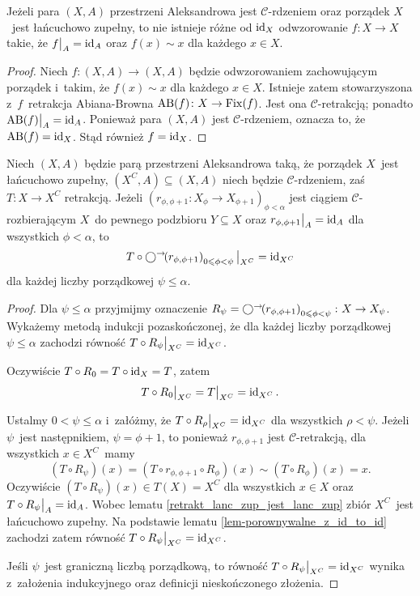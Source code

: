 \begin{lem}\label{lem-porownywalne_z_id_to_id}
Jeżeli para $(X,A)$ przestrzeni Aleksandrowa jest \mbox{$\mathcal{C}$-rdzeniem} oraz porządek $X$~jest łańcuchowo zupełny, to nie istnieje różne od $\operatorname{id}_X$ odwzorowanie $f\colon X\to X$ takie, że $f\big|_A=\operatorname{id}_A$ oraz $f(x)\sim x$ dla każdego $x\in X$.
\end{lem}
\begin{proof}
Niech $f\colon (X,A)\to (X,A)$ będzie odwzorowaniem zachowującym porządek i~takim, że $f(x)\sim x$ dla każdego $x\in X$. Istnieje zatem stowarzyszona z~$f$~retrakcja Abiana-Browna $\operatorname{AB}(f)\colon X\to \operatorname{Fix}(f)$. Jest ona $\mathcal{C}$-retrakcją; ponadto $\operatorname{AB}(f)\big|_A=\operatorname{id}_A$. Ponieważ para $(X,A)$ jest $\mathcal{C}$-rdzeniem, oznacza to, że $\operatorname{AB}(f)=\operatorname{id}_X$. Stąd również $f=\operatorname{id}_X$.
\end{proof}

\begin{lem}\label{lem-schroder_lemma}
Niech $(X,A)$ będzie parą przestrzeni Aleksandrowa taką, że porządek $X$~jest łańcuchowo zupełny, $(X^C,A)\subseteq (X,A)$ niech będzie $\mathcal{C}$-rdzeniem, zaś $T\colon X\to X^C$ retrakcją. Jeżeli $\left(r_{\phi,\phi+1}\colon X_\phi\to X_{\phi+1}\right)_{\phi<\alpha}$ jest ciągiem $\mathcal{C}$-rozbierającym $X$~do pewnego podzbioru $Y\subseteq X$ oraz $r_{\phi,\phi+1}\big|_A=\operatorname{id}_A$ dla wszystkich $\phi<\alpha$, to \[T\circ \bigcirc^\rightarrow\!\!\left(r_{\phi,\phi+1}\right)_{0\leqslant \phi<\psi}\big|_{X^C}=\operatorname{id}_{X^C}\] dla każdej liczby porządkowej $\psi\leq \alpha$. 
\end{lem}
\begin{proof}
Dla $\psi\leq \alpha$ przyjmijmy oznaczenie $R_\psi=\bigcirc^\rightarrow\!\!\left(r_{\phi,\phi+1}\right)_{0\leqslant \phi<\psi}\colon X\to X_{\psi}$. Wykażemy metodą indukcji pozaskończonej, że dla każdej liczby porządkowej $\psi\leq \alpha$ zachodzi równość $T\circ R_\psi\big|_{X^C}=\operatorname{id}_{X^C}$.

Oczywiście $T\circ R_0=T\circ \operatorname{id}_X=T$, zatem \[T\circ R_0\big|_{X^C}=T\big|_{X^C}=\operatorname{id}_{X^C}.\]

Ustalmy $0<\psi\leq \alpha$ i~załóżmy, że $T\circ R_\rho\big|_{X^C}=\operatorname{id}_{X^C}$ dla wszystkich $\rho<\psi$. Jeżeli $\psi$~jest następnikiem, $\psi=\phi+1$, to ponieważ $r_{\phi,\phi+1}$ jest $\mathcal{C}$-retrakcją, dla wszystkich $x\in X^C$~mamy \[\left(T\circ R_{\psi}\right)(x)=\left(T\circ r_{\phi,\phi+1}\circ R_\phi\right)(x)\sim \left(T\circ R_\phi\right)(x)=x.\] Oczywiście $\left(T\circ R_{\psi}\right)(x)\in T(X)=X^C$ dla wszystkich $x\in X$ oraz $T\circ R_{\psi}\big|_A=\operatorname{id}_A$. Wobec lematu \ref{retrakt_lanc_zup_jest_lanc_zup} zbiór $X^C$~jest łańcuchowo zupełny. Na podstawie lematu \ref{lem-porownywalne_z_id_to_id} zachodzi zatem równość $T\circ R_{\psi}\big|_{X^C}=\operatorname{id}_{X^C}$.

Jeśli $\psi$~jest graniczną liczbą porządkową, to równość $T\circ R_\psi\big|_{X^C}=\operatorname{id}_{X^C}$ wynika z~założenia indukcyjnego oraz definicji nieskończonego złożenia.
\end{proof}

